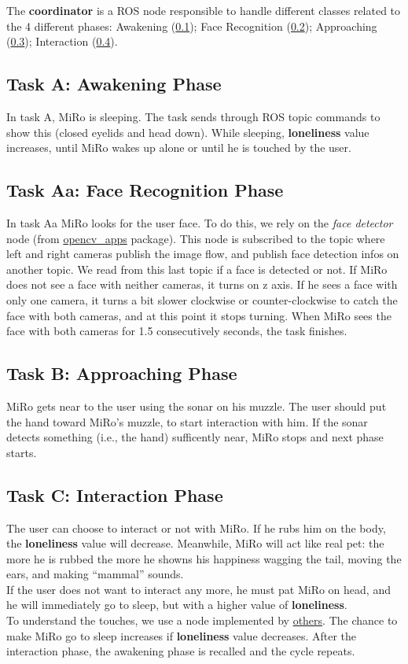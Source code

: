 \documentclass[12pt,peerreviewca, a4paper, onecolumn]{article}
\begin{document}
	\noindent The \textbf{coordinator} is a ROS node responsible to handle different classes related to the 4 different phases: Awakening (\ref{subsec:a}); Face Recognition (\ref{subsec:aa}); Approaching (\ref{subsec:b}); Interaction (\ref{subsec:c}).
	\subsection{Task A: Awakening Phase}
	\label{subsec:a}
	In task A, MiRo is sleeping. The task sends through ROS topic commands to show this (closed eyelids and head down). While sleeping, \textbf{loneliness} value increases, until MiRo wakes up alone or until he is touched by the user.
	\subsection{Task Aa: Face Recognition Phase}	\label{subsec:aa}
	In task Aa MiRo looks for the user face. To do this, we rely on the \textit{face detector} node  (from \href{http://wiki.ros.org/opencv_apps}{opencv\_apps} package). This node is subscribed to the topic where left and right cameras publish the image flow, and publish face detection infos on another topic. We read from this last topic if a face is detected or not.
	If MiRo does not see a face with neither cameras, it turns on z axis. If he sees a face with only one camera, it turns a bit slower clockwise or counter-clockwise to catch the face with both cameras, and at this point it stops turning. When MiRo sees the face with both cameras for 1.5 consecutively seconds, the task finishes.
	\subsection{Task B: Approaching Phase}	\label{subsec:b}
	MiRo gets near to the user using the sonar on his muzzle. The user should put the hand toward MiRo's muzzle, to start interaction with him. If the sonar detects something (i.e., the hand) sufficently near, MiRo stops and next phase starts.
	\subsection{Task C: Interaction Phase} 	\label{subsec:c} 
	The user can choose to interact or not with MiRo. If he rubs him on the body, the \textbf{loneliness} value will decrease. Meanwhile, MiRo will act like real pet: the more he is rubbed the more he showns his happiness wagging the tail, moving the ears, and making ``mammal'' sounds.\\
	If the user does not want to interact any more, he must pat MiRo on head, and he will immediately go to sleep, but with a higher value of \textbf{loneliness}.\\
	To understand the touches, we use a node implemented by \href{https://github.com/EmaroLab/Miro_SocialRobot/blob/master/README.md}{others}.
	The chance to make MiRo go to sleep increases if \textbf{loneliness} value decreases. After the interaction phase, the awakening phase is recalled and the cycle repeats. 
	
\end{document}
